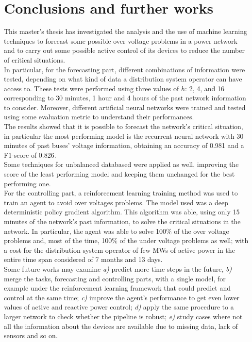 \chapter{Conclusions and further works}
\label{ch6}
This master's thesis has investigated the analysis and the use of machine learning techniques to forecast some possible over voltage problems in a power network and to carry out some possible active control of its devices to reduce the number of critical situations.\\

In particular, for the forecasting part, different combinations of information were tested, depending on what kind of data a distribution system operator can have access to. These tests were performed using three values of $h$: 2, 4, and 16 corresponding to 30 minutes, 1 hour and 4 hours of the past network information to consider. Moreover, different artificial neural networks were trained and tested using some evaluation metric to understand their performances.\\
The results showed that it is possible to forecast the network's critical situation, in particular the most performing model is the recurrent neural network with 30 minutes of past buses' voltage information, obtaining an accuracy of 0.981 and a F1-score of 0.826.\\
Some techniques for unbalanced databased were applied as well, improving the score of the least performing model and keeping them unchanged for the best performing one.\\

For the controlling part, a reinforcement learning training method was used to train an agent to avoid over voltages problems. The model used was a deep deterministic policy gradient algorithm. This algorithm was able, using only  15 minutes of the network's past information, to solve the critical situations in the network. In particular, the agent was able to solve 100\% of the over voltage problems and, most of the time, 100\% of the under voltage problems as well; with a cost for the distribution system operator of few MWs of active power in the entire time span considered of 7 months and 13 days.\\

Some future works may examine \emph{a)} predict more time steps in the future, \emph{b)} merge the tasks, forecasting and controlling parts, with a single model, for example under the reinforcement learning framework that could predict and control at the same time; \emph{c)} improve the agent's performance to get even lower values of active and reactive power control; \emph{d)} apply the same procedure to a larger network to check whether the pipeline is robust; \emph{e)} study cases where not all the information about the devices are available due to missing data, lack of sensors and so on.
